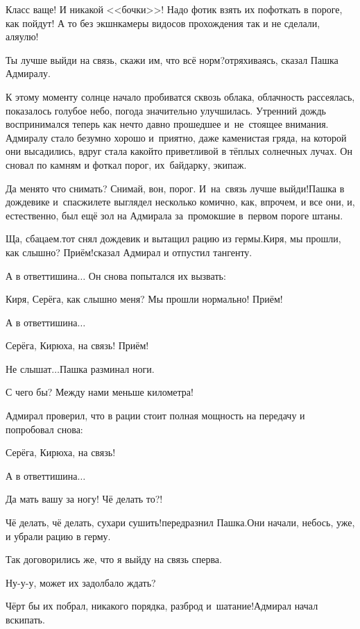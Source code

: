 \diagdash Класс ваще! И никакой <<бочки>>! Надо фотик взять их пофоткать в пороге, как пойдут! А то без экшн\sdash камеры видосов прохождения так и не сделали, аля\sdash улю!

\diagdash Ты лучше выйди на связь, скажи им, что всё норм?\mdash отряхиваясь, сказал Пашка Адмиралу.

К этому моменту солнце начало пробиватся сквозь облака, облачность рассеялась, показалось голубое небо, погода значительно улучшилась. Утренний дождь воспринимался теперь как нечто давно прошедшее и~не~стоящее внимания. Адмиралу стало безумно хорошо и~приятно, даже каменистая гряда, на которой они высадились, вдруг стала какой\sdash то приветливой в тёплых солнечных лучах. Он сновал по камням и фоткал порог, их~байдарку, экипаж.

\diagdash Да меня\sdash то что снимать? Снимай, вон, порог. И~на~связь лучше выйди!\mdash Пашка в дождевике и~спасжилете выглядел несколько комично, как, впрочем, и все они, и, естественно, был ещё зол на Адмирала за~промокшие в~первом пороге штаны. 

\diagdash Ща, сбацаем.\mdash тот снял дождевик и вытащил рацию из гермы.\mdash Киря, мы прошли, как слышно? Приём!\mdash сказал Адмирал и отпустил тангенту.

А в ответ\mdash тишина$\ldots$ Он снова попытался их вызвать:

\diagdash Киря, Серёга, как слышно меня? Мы прошли нормально! Приём!

А в ответ\mdash тишина$\ldots$

\diagdash Серёга, Кирюха, на связь! Приём!

\diagdash Не слышат$\ldots$\mdash Пашка разминал ноги.

\diagdash С чего бы? Между нами меньше километра!

Адмирал проверил, что в рации стоит полная мощность на передачу и попробовал снова:

\diagdash Серёга, Кирюха, на связь!

А в ответ\mdash тишина$\ldots$

\diagdash Да мать вашу за ногу! Чё делать то?!

\diagdash Чё делать, чё делать, сухари сушить!\mdash передразнил Пашка.\mdash Они начали, небось, уже, и убрали рацию в герму.

\diagdash Так договорились же, что я выйду на связь сперва.

\diagdash Ну-у-у, может их задолбало ждать?

\diagdash Чёрт бы их побрал, никакого порядка, разброд и~шатание!\mdash Адмирал начал вскипать.

